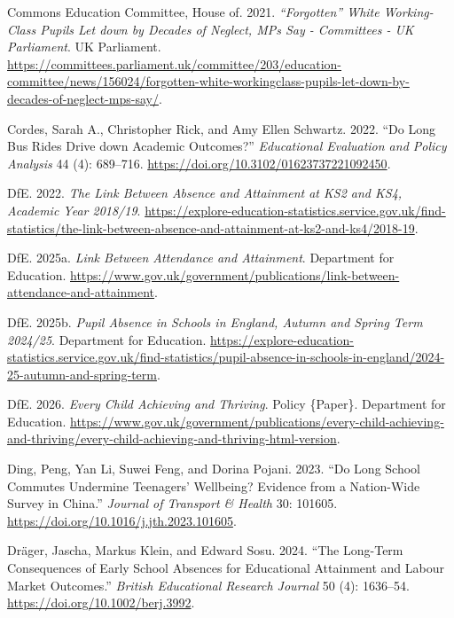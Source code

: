 \documentclass[
  12pt,
  titlepage]{article}
\newlength{\cslhangindent}
\newenvironment{CSLReferences}[2] %
 {\begin{list}{}{%
  \setlength{\itemindent}{0pt}
  \setlength{\leftmargin}{0pt}
  \setlength{\parsep}{0pt}
  \ifodd #1
   \setlength{\leftmargin}{\cslhangindent}
   \setlength{\itemindent}{-1\cslhangindent}
  \fi
  \setlength{\itemsep}{#2\baselineskip}}}
 {\end{list}}
\begin{document}
\begin{CSLReferences}{1}{1}
Commons Education Committee, House of. 2021. \emph{{``{Forgotten}''}
{White} Working-Class Pupils Let down by Decades of Neglect, {MPs} Say -
{Committees} - {UK} {Parliament}}. UK Parliament.
\url{https://committees.parliament.uk/committee/203/education-committee/news/156024/forgotten-white-workingclass-pupils-let-down-by-decades-of-neglect-mps-say/}.

Cordes, Sarah A., Christopher Rick, and Amy Ellen Schwartz. 2022. {``Do
Long Bus Rides Drive down Academic Outcomes?''} \emph{Educational
Evaluation and Policy Analysis} 44 (4): 689--716.
\url{https://doi.org/10.3102/01623737221092450}.

DfE. 2022. \emph{The Link Between Absence and Attainment at {KS2} and
{KS4}, {Academic} Year 2018/19}.
\url{https://explore-education-statistics.service.gov.uk/find-statistics/the-link-between-absence-and-attainment-at-ks2-and-ks4/2018-19}.

DfE. 2025a. \emph{Link Between Attendance and Attainment}. Department
for Education.
\url{https://www.gov.uk/government/publications/link-between-attendance-and-attainment}.

DfE. 2025b. \emph{Pupil Absence in Schools in {England}, {Autumn} and
Spring Term 2024/25}. Department for Education.
\url{https://explore-education-statistics.service.gov.uk/find-statistics/pupil-absence-in-schools-in-england/2024-25-autumn-and-spring-term}.

DfE. 2026. \emph{Every Child Achieving and Thriving}. Policy \{Paper\}.
Department for Education.
\url{https://www.gov.uk/government/publications/every-child-achieving-and-thriving/every-child-achieving-and-thriving-html-version}.

Ding, Peng, Yan Li, Suwei Feng, and Dorina Pojani. 2023. {``Do Long
School Commutes Undermine Teenagers' Wellbeing? {Evidence} from a
Nation-Wide Survey in {China}.''} \emph{Journal of Transport \& Health}
30: 101605. \url{https://doi.org/10.1016/j.jth.2023.101605}.

Dräger, Jascha, Markus Klein, and Edward Sosu. 2024. {``The Long-Term
Consequences of Early School Absences for Educational Attainment and
Labour Market Outcomes.''} \emph{British Educational Research Journal}
50 (4): 1636--54. \url{https://doi.org/10.1002/berj.3992}.


\end{CSLReferences}
\end{document}
